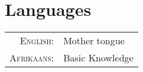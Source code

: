 \section{Languages}

\begin{tabular}{rl}
	  \textsc{English:} & Mother tongue   \\
	\textsc{Afrikaans:} & Basic Knowledge 
\end{tabular}